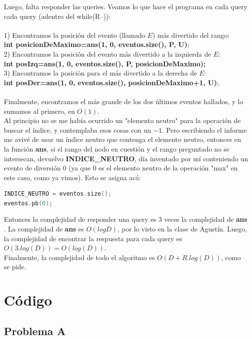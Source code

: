 \documentclass[a4paper]{article}
\begin{document}
Luego, falta responder las queries. Veamos lo que hace el programa en cada query cada query (adentro del while(R--)):\\
\\
1) Encontramos la posición del evento (llamado $E$) más divertido del rango: \\
\textbf{int posicionDeMaximo=ans(1, 0, eventos.size(), P, U)};\\
2) Encontramos la posición del evento más divertido a la izquierda de $E$: \\
\textbf{int posIzq=ans(1, 0, eventos.size(), P, posicionDeMaximo);}\\
3) Encontramos la posición para el más divertido a la derecha de $E$: \\
\textbf{int posDer=ans(1, 0, eventos.size(), posicionDeMaximo+1, U)};\\
\\
Finalmente, encontramos el más grande de los dos últimos eventos hallados, y lo sumamos al primero, en $O(1)$.\\
Al principio no se me había ocurrido un "elemento neutro" para la operación de buscar el índice, y contemplaba esos cosas con un $-1$. Pero escribiendo el informe me avivé de usar un índice neutro que contenga el elemento neutro, entonces en la función \textbf{ans}, si el rango del nodo en cuestión y el rango preguntado no se intersecan, devuelvo \textbf{INDICE\_NEUTRO}, día inventado por mí conteniendo un evento de diversión $0$ (ya que $0$ es el elemento neutro de la operación "max" en este caso, como ya vimos).
Esto se asigna acá:
\begin{lstlisting}[language=c++]
INDICE_NEUTRO = eventos.size();
eventos.pb(0);
\end{lstlisting}

Entonces la complejidad de responder una query es $3$ veces la complejidad de \textbf{ans} . La complejidad de \textbf{ans} es $O(log D)$, por lo visto en la clase de Agustín.
Luego, la complejidad de encontrar la respuesta para cada query es $O(3.log(D)) = O(log(D))$.\\

Finalmente, la complejidad de todo el algoritmo es $O(D + R.log(D))$, como se pide.

\newpage

\section{C\'odigo}

\subsection{Problema A}
\end{document}
